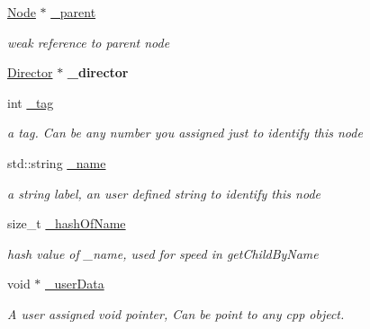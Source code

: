 \begin{DoxyCompactItemize}
\hyperlink{classNode}{Node} $\ast$ \hyperlink{classNode_af296e261174980bbffee33e800a855e1}{\+\_\+parent}
\begin{DoxyCompactList}\small\item\em weak reference to parent node \end{DoxyCompactList}\item 
\mbox{\label{classNode_a4095a3cc52148ba910b8efc3c1c8171a}} 
\hyperlink{classDirector}{Director} $\ast$ {\bfseries \+\_\+director}
\item 
\mbox{\label{classNode_a7d50f1ccf5904957fb7134c81bcbe0a9}} 
int \hyperlink{classNode_a7d50f1ccf5904957fb7134c81bcbe0a9}{\+\_\+tag}
\begin{DoxyCompactList}\small\item\em a tag. Can be any number you assigned just to identify this node \end{DoxyCompactList}\item 
\mbox{\label{classNode_a7fb92ed8ca02f47ffa4dfe83500b7fd0}} 
std\+::string \hyperlink{classNode_a7fb92ed8ca02f47ffa4dfe83500b7fd0}{\+\_\+name}
\begin{DoxyCompactList}\small\item\em a string label, an user defined string to identify this node \end{DoxyCompactList}\item 
\mbox{\label{classNode_a3634113fb2c6c57021375ae27cff2984}} 
size\+\_\+t \hyperlink{classNode_a3634113fb2c6c57021375ae27cff2984}{\+\_\+hash\+Of\+Name}
\begin{DoxyCompactList}\small\item\em hash value of \+\_\+name, used for speed in get\+Child\+By\+Name \end{DoxyCompactList}\item 
\mbox{\label{classNode_ae9c10dd02609cdea8a3cc6861f10b381}} 
void $\ast$ \hyperlink{classNode_ae9c10dd02609cdea8a3cc6861f10b381}{\+\_\+user\+Data}
\begin{DoxyCompactList}\small\item\em A user assigned void pointer, Can be point to any cpp object. \end{DoxyCompactList}\item 
\mbox{\label{classNode_a0c483cd6aa6c7f516b332a27c8ddffbb}} 

\end{DoxyCompactItemize}
